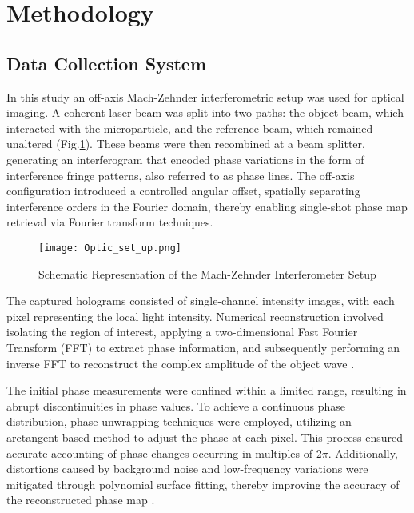 \documentclass[10pt,twocolumn]{article}
\begin{document}
\section{Methodology}

\subsection{Data Collection System}

In this study an off-axis Mach-Zehnder interferometric setup was used for optical imaging. A coherent laser beam was split into two paths: the object beam, which interacted with the microparticle, and the reference beam, which remained unaltered (Fig.\ref{fig:set_up}). These beams were then recombined at a beam splitter, generating an interferogram that encoded phase variations in the form of interference fringe patterns, also referred to as phase lines. The off-axis configuration introduced a controlled angular offset, spatially separating interference orders in the Fourier domain, thereby enabling single-shot phase map retrieval via Fourier transform techniques.

\begin{figure}[ht]
    \centering
    \vspace{-0.3cm}
    \texttt{[image: Optic\_set\_up.png]}
    \vspace{-0.8cm}
    \caption{\centering Schematic Representation of the Mach-Zehnder Interferometer Setup}
    \label{fig:set_up}
\end{figure}

The captured holograms consisted of single-channel intensity images, with each pixel representing the local light intensity. Numerical reconstruction involved isolating the region of interest, applying a two-dimensional Fast Fourier Transform (FFT) to extract phase information, and subsequently performing an inverse FFT to reconstruct the complex amplitude of the object wave \cite{poon2014introduction}.

The initial phase measurements were confined within a limited range, resulting in abrupt discontinuities in phase values. To achieve a continuous phase distribution, phase unwrapping techniques were employed, utilizing an arctangent-based method to adjust the phase at each pixel. This process ensured accurate accounting of phase changes occurring in multiples of \(2\pi\). Additionally, distortions caused by background noise and low-frequency variations were mitigated through polynomial surface fitting, thereby improving the accuracy of the reconstructed phase map \cite{Vannoni2007}. 
\end{document}
